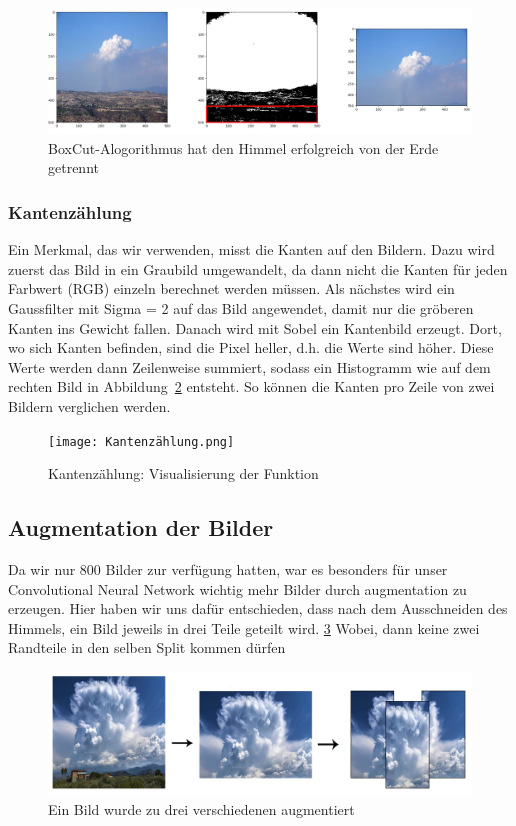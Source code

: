 \documentclass[a4,german]{article}
\begin{document}
\begin{figure}[h!]
\centering
\includegraphics[width=1.1\textwidth]{boxAlg} %
\caption{BoxCut-Alogorithmus hat den Himmel erfolgreich von der Erde getrennt}
\label{fig:boxAlg}
\end{figure}

\subsubsection{Kantenzählung}
Ein Merkmal, das wir verwenden, misst die Kanten auf den Bildern. Dazu wird zuerst das Bild in ein Graubild umgewandelt, da dann nicht die Kanten für jeden Farbwert (RGB) einzeln berechnet werden müssen. Als nächstes wird ein Gaussfilter mit Sigma = 2 auf das Bild angewendet, damit nur die gröberen Kanten ins Gewicht fallen. Danach wird mit Sobel ein Kantenbild erzeugt. Dort, wo sich Kanten befinden, sind die Pixel heller, d.h. die Werte sind höher. Diese Werte werden dann Zeilenweise summiert, sodass ein Histogramm wie auf dem rechten Bild in Abbildung~\ref{fig:kaz} entsteht. So können die Kanten pro Zeile von zwei Bildern verglichen werden.

\begin{figure}[h!]
\centering
\texttt{[image: Kantenzählung.png]}
\caption{Kantenzählung: Visualisierung der Funktion}
    \label{fig:kaz}
\end{figure}

\subsection{Augmentation der Bilder}
Da wir nur 800 Bilder zur verfügung hatten, war es besonders für unser Convolutional Neural Network wichtig mehr Bilder durch augmentation zu erzeugen.
Hier haben wir uns dafür entschieden, dass nach dem Ausschneiden des Himmels, ein Bild jeweils in drei Teile geteilt wird. \ref{fig:augmentation}
Wobei, dann keine zwei Randteile in den selben Split kommen dürfen %
\begin{figure}[h!]
\centering
\includegraphics[width=\textwidth]{Augmentation}
\caption{Ein Bild wurde zu drei verschiedenen augmentiert}
    \label{fig:augmentation}
\end{figure}
\end{document}
